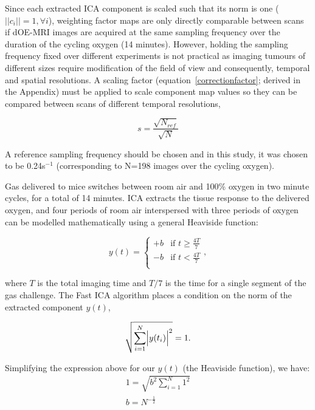 Since each extracted \acs{ICA} component is scaled such that its norm is one ($||c_i||=1, \forall i $), weighting factor maps are only directly comparable between scans if \acs{dOE-MRI} images are acquired at the same sampling frequency over the duration of the cycling oxygen (14 minutes).
However, holding the sampling frequency fixed over different experiments is not practical as imaging tumours of different sizes require modification of the field of view and consequently, temporal and spatial resolutions.
A scaling factor (equation~\ref{correctionfactor}; derived in the Appendix) must be applied to scale component map values so they can be compared between scans of different temporal resolutions,

\begin{equation}
s = \frac{\sqrt{N_{ref}}}{\sqrt{N}}
\label{correctionfactor}
\end{equation}

A reference sampling frequency should be chosen and in this study, it was chosen to be 0.24s$^{-1}$ (corresponding to N=198 images over the cycling oxygen).

Gas delivered to mice switches between room air and 100\% oxygen in two minute cycles, for a total of 14 minutes.
\acs{ICA} extracts the tissue response to the delivered oxygen, and four periods of room air interspersed with three periods of oxygen can be modelled mathematically using a general Heaviside function:

\begin{equation}
y(t) =
  \begin{cases}
                                   +b & \text{if $t\geq \frac{4T}{7}$} \\
                                   -b & \text{if $t< \frac{4T}{7}$} \\
  \end{cases},
\end{equation}

where $T$ is the total imaging time and $T/7$ is the time for a single segment of the gas challenge.
The Fast \acs{ICA} algorithm places a condition on the norm of the extracted component $y(t)$,

\begin{equation}
\sqrt{\sum_{i=1}^{N} \Bigl|y(t_i)\Bigr|^2} = 1.
\end{equation}

Simplifying the expression above for our $y(t)$ (the Heaviside function), we have:
\begin{align}
1 = \sqrt{b^2 \sum_{i=1}^{N} 1^2} \nonumber \\
b = N^{-\frac{1}{2}}
\end{align}


